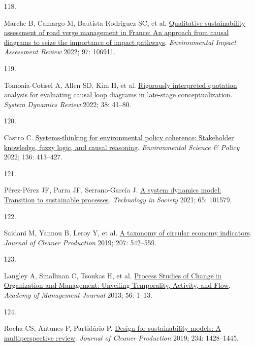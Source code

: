\documentclass[
  11pt,
  a4paperpaper,
  onecolumn]{article}
\newlength{\cslhangindent}
\newlength{\csllabelwidth}
\newlength{\cslentryspacingunit} %
\newenvironment{CSLReferences}[2] %
 {%
  \setlength{\parindent}{0pt}
  \ifodd #1
  \let\oldpar\par
  \def\par{\hangindent=\cslhangindent\oldpar}
  \fi
  \setlength{\parskip}{#2\cslentryspacingunit}
 }%
 {}
\newcommand{\CSLLeftMargin}[1]{\parbox[t]{\csllabelwidth}{#1}}
\newcommand{\CSLRightInline}[1]{\parbox[t]{\linewidth - \csllabelwidth}{#1}\break}
\begin{document}
\begin{CSLReferences}{0}{0}
\leavevmode{}%
\CSLLeftMargin{118. }%
\CSLRightInline{Marche B, Camargo M, Bautista Rodriguez SC, et al.
\href{https://doi.org/10.1016/j.eiar.2022.106911}{Qualitative
sustainability assessment of road verge management in {France}: {An}
approach from causal diagrams to seize the importance of impact
pathways}. \emph{Environmental Impact Assessment Review} 2022; 97:
106911.}

\leavevmode{}%
\CSLLeftMargin{119. }%
\CSLRightInline{Tomoaia-Cotisel A, Allen SD, Kim H, et al.
\href{https://doi.org/10.1002/SDR.1701}{Rigorously interpreted quotation
analysis for evaluating causal loop diagrams in late-stage
conceptualization}. \emph{System Dynamics Review} 2022; 38: 41--80.}

\leavevmode{}%
\CSLLeftMargin{120. }%
\CSLRightInline{Castro C.
\href{https://doi.org/10.1016/j.envsci.2022.07.001}{Systems-thinking for
environmental policy coherence: {Stakeholder} knowledge, fuzzy logic,
and causal reasoning}. \emph{Environmental Science \& Policy} 2022; 136:
413--427.}

\leavevmode{}%
\CSLLeftMargin{121. }%
\CSLRightInline{Pérez-Pérez JF, Parra JF, Serrano-García J.
\href{https://doi.org/10.1016/j.techsoc.2021.101579}{A system dynamics
model: {Transition} to sustainable processes}. \emph{Technology in
Society} 2021; 65: 101579.}

\leavevmode{}%
\CSLLeftMargin{122. }%
\CSLRightInline{Saidani M, Yannou B, Leroy Y, et al.
\href{https://doi.org/10.1016/j.jclepro.2018.10.014}{A taxonomy of
circular economy indicators}. \emph{Journal of Cleaner Production} 2019;
207: 542--559.}

\leavevmode{}%
\CSLLeftMargin{123. }%
\CSLRightInline{Langley A, Smallman C, Tsoukas H, et al.
\href{https://doi.org/10.5465/amj.2013.4001}{Process {Studies} of
{Change} in {Organization} and {Management}: {Unveiling Temporality},
{Activity}, and {Flow}}. \emph{Academy of Management Journal} 2013; 56:
1--13.}

\leavevmode{}%
\CSLLeftMargin{124. }%
\CSLRightInline{Rocha CS, Antunes P, Partidário P.
\href{https://doi.org/10.1016/j.jclepro.2019.06.108}{Design for
sustainability models: {A} multiperspective review}. \emph{Journal of
Cleaner Production} 2019; 234: 1428--1445.}

\end{CSLReferences}
\end{document}
